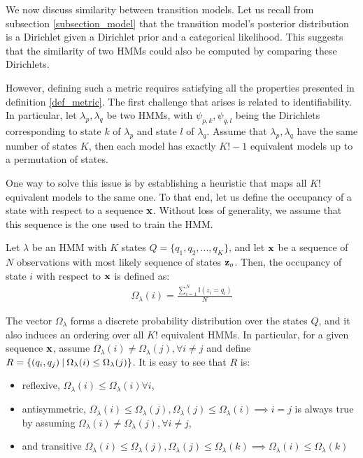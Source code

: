 \documentclass[../main.tex]{subfiles}
\begin{document}
\par We now discuss similarity between transition models. Let us recall from subsection \ref{subsection_model} that the transition model's posterior distribution is a Dirichlet given a Dirichlet prior and a categorical likelihood. This suggests that the similarity of two HMMs could also be computed by comparing these Dirichlets.
\par However, defining such a metric requires satisfying all the properties presented in definition \ref{def_metric}. The first challenge that arises is related to identifiability. In particular, let $\lambda_p, \lambda_q$ be two HMMs, with $\psi_{p, k}, \psi_{q, l}$ being the Dirichlets corresponding to state $k$ of $\lambda_p$ and state $l$ of $\lambda_q$. Assume that $\lambda_p, \lambda_q$ have the same number of states $K$, then each model has exactly $K!-1$ equivalent models up to a permutation of states. \par One way to solve this issue is by establishing a heuristic that maps all $K!$ equivalent models to the same one. To that end, let us define the occupancy of a state with respect to a sequence $\mathbf{x}$. Without loss of generality, we assume that this sequence is the one used to train the HMM.
\begin{definition}\label{def_occupancy}
Let $\lambda$ be an HMM with $K$ states $Q = \{q_1, q_2, ..., q_K\}$, and let $\mathbf{x}$ be a sequence of $N$ observations with most likely sequence of states $\mathbf{z}_o$. Then, the occupancy of state $i$ with respect to $\mathbf{x}$ is defined as:
\begin{align*}
\Omega_\lambda(i) = \frac{\sum_{i=1}^N\mathbb{I}(z_{i} = q_i)}{N}
\end{align*}
\end{definition}
\par The vector $\Omega_\lambda$ forms a discrete probability distribution over the states $Q$, and it also induces an ordering over all $K!$ equivalent HMMs. In particular, for a given sequence $\mathbf{x}$, assume $\Omega_\lambda(i) \neq \Omega_\lambda(j), \forall i\neq j$ and define $R = \{(q_i, q_j) \:\vert\: \Omega_\lambda(i) \leq \Omega_\lambda(j)\}$. It is easy to see that $R$ is:
\begin{itemize}
\item reflexive, $\Omega_\lambda(i) \leq \Omega_\lambda(i) \forall i$,
\item antisymmetric, $\Omega_\lambda(i) \leq \Omega_\lambda(j), \Omega_\lambda(j) \leq \Omega_\lambda(i) \implies i = j$ is always true by assuming $\Omega_\lambda(i) \neq \Omega_\lambda(j), \forall i\neq j$,
\item and transitive $\Omega_\lambda(i) \leq \Omega_\lambda(j), \Omega_\lambda(j) \leq \Omega_\lambda(k) \implies \Omega_\lambda(i) \leq \Omega_\lambda(k)$
\end{itemize}
\end{document}
